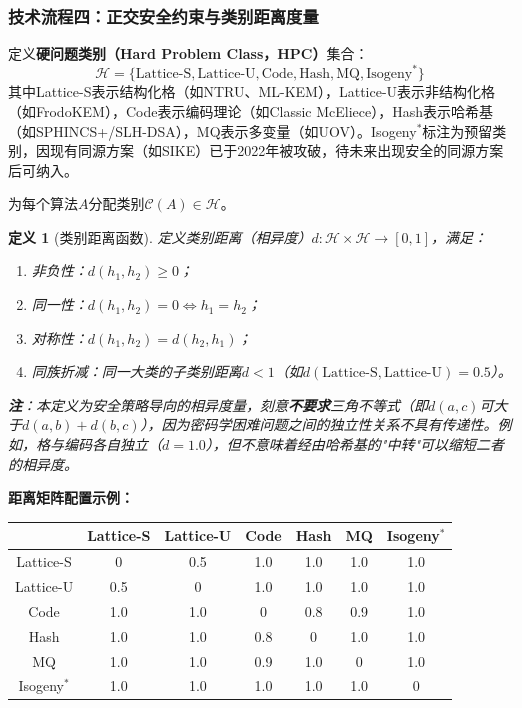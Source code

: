 ﻿\documentclass[12pt,a4paper]{article}
\newtheorem{definition}{定义}
\begin{document}
\subsubsection{技术流程四：正交安全约束与类别距离度量}

定义\textbf{硬问题类别（Hard Problem Class，HPC）}集合：
\[
\mathcal{H} = \{\text{Lattice-S}, \text{Lattice-U}, \text{Code}, \text{Hash}, \text{MQ}, \text{Isogeny}^*\}
\]
其中Lattice-S表示结构化格（如NTRU、ML-KEM），Lattice-U表示非结构化格（如FrodoKEM），Code表示编码理论（如Classic McEliece），Hash表示哈希基（如SPHINCS+/SLH-DSA），MQ表示多变量（如UOV）。Isogeny$^*$标注为预留类别，因现有同源方案（如SIKE）已于2022年被攻破，待未来出现安全的同源方案后可纳入。

为每个算法$A$分配类别$\mathcal{C}(A) \in \mathcal{H}$。

\begin{definition}[类别距离函数]
定义类别距离（相异度）$d: \mathcal{H} \times \mathcal{H} \to [0, 1]$，满足：
\begin{enumerate}[label=(\roman*)]
    \item 非负性：$d(h_1, h_2) \geq 0$；
    \item 同一性：$d(h_1, h_2) = 0 \iff h_1 = h_2$；
    \item 对称性：$d(h_1, h_2) = d(h_2, h_1)$；
    \item 同族折减：同一大类的子类别距离$d < 1$（如$d(\text{Lattice-S}, \text{Lattice-U}) = 0.5$）。
\end{enumerate}
\textbf{注}：本定义为安全策略导向的相异度量，刻意\textbf{不要求}三角不等式（即$d(a,c)$可大于$d(a,b)+d(b,c)$），因为密码学困难问题之间的独立性关系不具有传递性。例如，格与编码各自独立（$d=1.0$），但不意味着经由哈希基的"中转"可以缩短二者的相异度。
\end{definition}

\textbf{距离矩阵配置示例：}

\begin{center}
\begin{tabular}{|c|c|c|c|c|c|c|}
\hline
 & Lattice-S & Lattice-U & Code & Hash & MQ & Isogeny$^*$ \\
\hline
Lattice-S & 0 & 0.5 & 1.0 & 1.0 & 1.0 & 1.0 \\
\hline
Lattice-U & 0.5 & 0 & 1.0 & 1.0 & 1.0 & 1.0 \\
\hline
Code & 1.0 & 1.0 & 0 & 0.8 & 0.9 & 1.0 \\
\hline
Hash & 1.0 & 1.0 & 0.8 & 0 & 1.0 & 1.0 \\
\hline
MQ & 1.0 & 1.0 & 0.9 & 1.0 & 0 & 1.0 \\
\hline
Isogeny$^*$ & 1.0 & 1.0 & 1.0 & 1.0 & 1.0 & 0 \\
\hline
\end{tabular}
\end{center}
\end{document}
